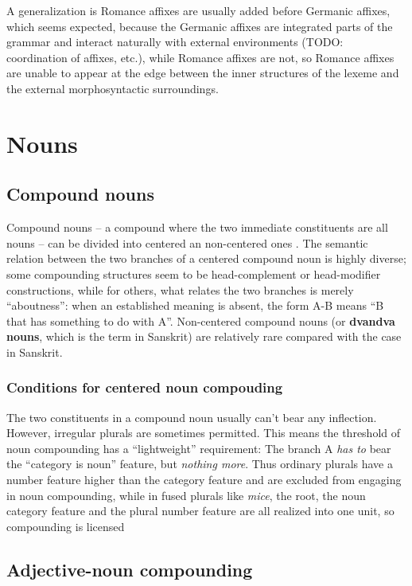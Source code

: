 \documentclass[UTF8, a4paper, oneside, scheme=plain]{ctexrep}
\newcommand*{\citesec}[1]{\S~{#1}}
\newcommand*{\citepages}[1]{pp.~{#1}}
\newcommand*{\concept}[1]{\textbf{#1}}
\newcommand{\corpus}[1]{\emph{#1}}
\begin{document}
A generalization is Romance affixes are usually added before Germanic affixes,
which seems expected,
because the Germanic affixes are integrated parts of the grammar 
and interact naturally with external environments
(TODO: coordination of affixes, etc.),
while Romance affixes are not,
so Romance affixes are unable to appear at the edge 
between the inner structures of the lexeme and the external morphosyntactic surroundings.

\section{Nouns}

\subsection{Compound nouns}\label{sec:pos.noun.compound}

Compound nouns -- a compound where the two immediate constituents are all nouns -- 
can be divided into centered an non-centered ones
\citep[\citepages{1646-1648}]{cgel}.
The semantic relation between the two branches of a centered compound noun
is highly diverse; 
some compounding structures seem to be head-complement or head-modifier constructions,
while for others, what relates the two branches is merely ``aboutness'':
when an established meaning is absent,
the form A-B means ``B that has something to do with A''.
Non-centered compound nouns 
(or \concept{dvandva nouns}, which is the term in Sanskrit) 
are relatively rare
compared with the case in Sanskrit.

\subsubsection{Conditions for centered noun compouding}

The two constituents in a compound noun usually can't bear any inflection.
However, irregular plurals are sometimes permitted.
This means the threshold of noun compounding has a ``lightweight'' requirement:
The branch A \emph{has to} bear the ``category is noun'' feature,
but \emph{nothing more}.
Thus ordinary plurals have a number feature higher than the category feature 
and are excluded from engaging in noun compounding,
while in fused plurals like \corpus{mice},
the root, the noun category feature and the plural number feature 
are all realized into one unit,
so compounding is licensed \citep[\citesec{7.1}]{siddiqi2009syntax}

\subsection{Adjective-noun compounding}
\end{document}
